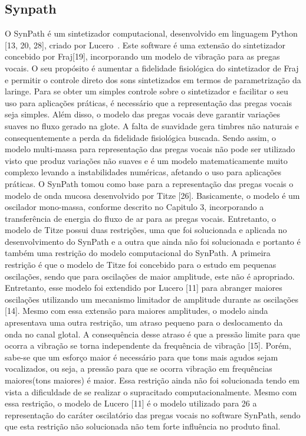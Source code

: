 	\subsection{Synpath}
		O SynPath é um sintetizador computacional, desenvolvido em linguagem Python [13, 20, 28], criado por Lucero~\cite{LuceroZueiro1}. Este software é uma extensão do sintetizador concebido por Fraj[19], incorporando um modelo de vibração para as pregas vocais. O seu propósito é aumentar a ﬁdelidade ﬁsiológica do sintetizador de Fraj e permitir o controle direto dos sons sintetizados em termos de parametrização da laringe. Para se obter um simples controle sobre o sintetizador e facilitar o seu uso para aplicações práticas, é necessário que a representação das pregas vocais seja simples. Além disso, o modelo das pregas vocais deve garantir variações suaves no ﬂuxo gerado na glote. A falta de suavidade gera timbres não naturais e consequentemente a perda da ﬁdelidade ﬁsiológica buscada. Sendo assim, o modelo multi-massa para representação das pregas vocais não pode ser utilizado visto que produz variações não suaves e é um modelo matematicamente muito complexo levando a instabilidades numéricas, afetando o uso para aplicações práticas. O SynPath tomou como base para a representação das pregas vocais o modelo de onda mucosa desenvolvido por Titze [26]. Basicamente, o modelo é um oscilador mono-massa, conforme descrito no Capitulo 3, incorporando a transferência de energia do ﬂuxo de ar para as pregas vocais. Entretanto, o modelo de Titze possui duas restrições, uma que foi solucionada e aplicada no desenvolvimento do SynPath e a outra que ainda não foi solucionada e portanto é também uma restrição do modelo computacional do SynPath. A primeira restrição é que o modelo de Titze foi concebido para o estudo em pequenas oscilações, sendo que para oscilações de maior amplitude, este não é apropriado. Entretanto, esse modelo foi extendido por Lucero [11] para abranger maiores oscilações utilizando um mecanismo limitador de amplitude durante as oscilações [14]. Mesmo com essa extensão para maiores amplitudes, o modelo ainda apresentava uma outra restrição, um atraso pequeno para o deslocamento da onda no canal glotal. A consequência desse atraso é que a pressão limite para que ocorra a vibração se torna independente da frequência de vibração [15]. Porém, sabe-se que um esforço maior é necessário para que tons mais agudos sejam vocalizados, ou seja, a pressão para que se ocorra vibração em frequências maiores(tons maiores) é maior. Essa restrição ainda não foi solucionada tendo em vista a diﬁculdade de se realizar o supracitado computacionalmente. Mesmo com essa restrição, o modelo de Lucero [11] é o modelo utilizado para
		26
		a representação do caráter oscilatório das pregas vocais no software SynPath, sendo que esta restrição não solucionada não tem forte inﬂuência no produto ﬁnal.
		
